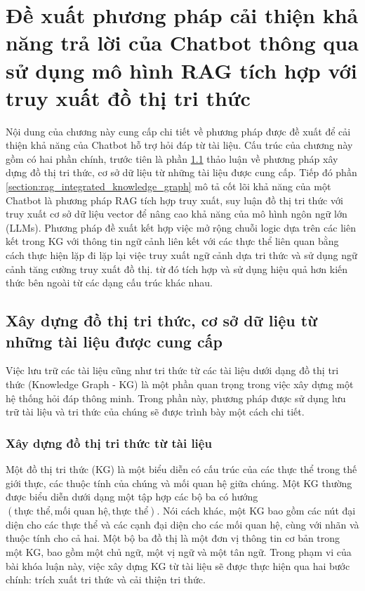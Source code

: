\chapter{Đề xuất phương pháp cải thiện khả năng trả lời của Chatbot thông qua sử dụng mô hình RAG tích hợp với truy xuất đồ thị tri thức}
\label{chapter:proposed_method}

Nội dung của chương này cung cấp chi tiết về phương pháp được đề xuất để cải thiện khả năng của Chatbot hỗ trợ hỏi đáp từ tài liệu. Cấu trúc của chương này gồm có hai phần chính, trước tiên là phần \ref{section:storage_knowledge} thảo luận về phương pháp xây dựng đồ thị tri thức, cơ sở dữ liệu từ những tài liệu được cung cấp. Tiếp đó phần \ref{section:rag_integrated_knowledge_graph} mô tả cốt lõi khả năng của một Chatbot là phương pháp RAG tích hợp truy xuất, suy luận đồ thị tri thức với truy xuất cơ sở dữ liệu vector để nâng cao khả năng của mô hình ngôn ngữ lớn (LLMs). Phương pháp đề xuất kết hợp việc mở rộng chuỗi logic dựa trên các liên kết trong KG với thông tin ngữ cảnh liên kết với các thực thể liên quan bằng cách thực hiện lặp đi lặp lại việc truy xuất ngữ cảnh dựa tri thức và sử dụng ngữ cảnh tăng cường truy xuất đồ thị. từ đó tích hợp và sử dụng hiệu quả hơn kiến thức bên ngoài từ các dạng cấu trúc khác nhau.

\section{Xây dựng đồ thị tri thức, cơ sở dữ liệu từ những tài liệu được cung cấp}
\label{section:storage_knowledge}
Việc lưu trữ các tài liệu cũng như tri thức từ các tài liệu dưới dạng đồ thị tri thức (Knowledge Graph - KG) là một phần quan trọng trong việc xây dựng một hệ thống hỏi đáp thông minh. Trong phần này, phương pháp được sử dụng lưu trữ tài liệu và tri thức của chúng sẽ được trình bày một cách chi tiết.
\subsection{Xây dựng đồ thị tri thức từ tài liệu}
\label{subsection:knowledge_graph_construction_from_document}
Một đồ thị tri thức (KG) là một biểu diễn có cấu trúc của các thực thể trong thế giới thực, các thuộc tính của chúng và mối quan hệ giữa chúng. Một KG thường được biểu diễn dưới dạng một tập hợp các bộ ba có hướng \((\text{thực thể}, \text{mối quan hệ}, \text{thực thể})\). Nói cách khác, một KG bao gồm các nút đại diện cho các thực thể và các cạnh đại diện cho các mối quan hệ, cùng với nhãn và thuộc tính cho cả hai. Một bộ ba đồ thị là một đơn vị thông tin cơ bản trong một KG, bao gồm một chủ ngữ, một vị ngữ và một tân ngữ.
Trong phạm vi của bài khóa luận này, việc xây dựng KG từ tài liệu sẽ được thực hiện qua hai bước chính: trích xuất tri thức và cải thiện tri thức.

